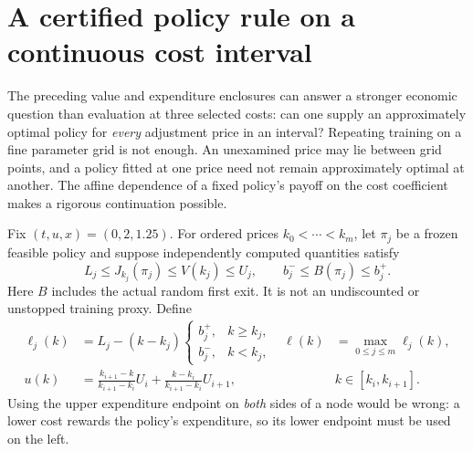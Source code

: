 \section{A certified policy rule on a continuous cost interval}\label{r12:continuation}
The preceding value and expenditure enclosures can answer a stronger economic question than evaluation at three selected costs: can one supply an approximately optimal policy for \emph{every} adjustment price in an interval? Repeating training on a fine parameter grid is not enough. An unexamined price may lie between grid points, and a policy fitted at one price need not remain approximately optimal at another. The affine dependence of a fixed policy's payoff on the cost coefficient makes a rigorous continuation possible.

Fix $(t,u,x)=(0,2,1.25)$. For ordered prices $k_0<\cdots<k_m$, let $\pi_j$ be a frozen feasible policy and suppose independently computed quantities satisfy
\begin{equation}
 L_j\leq J_{k_j}(\pi_j)\leq V(k_j)\leq U_j,
 \qquad b_j^-\leq B(\pi_j)\leq b_j^+.
 \label{r12:node}
\end{equation}
Here $B$ includes the actual random first exit. It is not an undiscounted or unstopped training proxy. Define
\begin{align}
 \ell_j(k)&=L_j-(k-k_j)
 \begin{cases}b_j^+,&k\geq k_j,\\ b_j^-,&k<k_j,\end{cases}
 &\ell(k)&=\max_{0\leq j\leq m}\ell_j(k),\label{r12:lower}\\
 u(k)&=\frac{k_{i+1}-k}{k_{i+1}-k_i}U_i+
        \frac{k-k_i}{k_{i+1}-k_i}U_{i+1},
 && k\in[k_i,k_{i+1}].\label{r12:chord}
\end{align}
Using the upper expenditure endpoint on \emph{both} sides of a node would be wrong: a lower cost rewards the policy's expenditure, so its lower endpoint must be used on the left.

